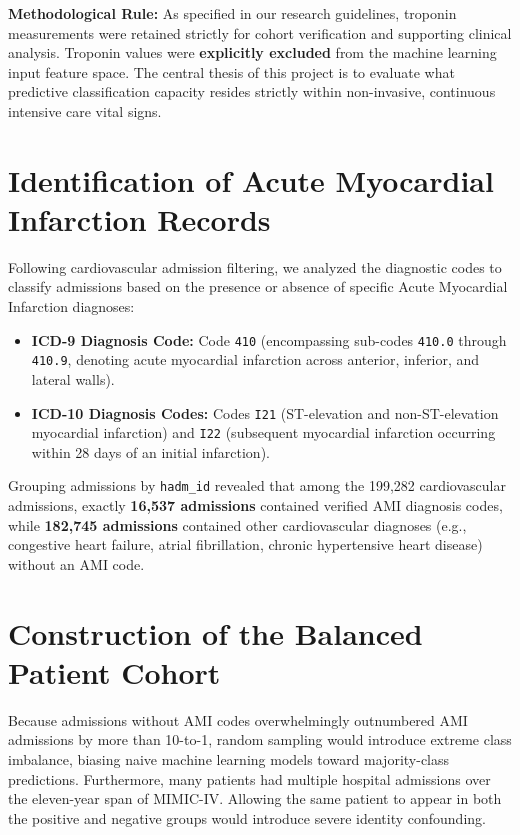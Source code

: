 \documentclass[12pt,a4paper,oneside]{report}
\begin{document}
\textbf{Methodological Rule:} As specified in our research guidelines, troponin measurements were retained strictly for cohort verification and supporting clinical analysis. Troponin values were \textbf{explicitly excluded} from the machine learning input feature space. The central thesis of this project is to evaluate what predictive classification capacity resides strictly within non-invasive, continuous intensive care vital signs.

\section{Identification of Acute Myocardial Infarction Records}
\label{sec:ami_identification}

Following cardiovascular admission filtering, we analyzed the diagnostic codes to classify admissions based on the presence or absence of specific Acute Myocardial Infarction diagnoses:
\begin{itemize}
    \item \textbf{ICD-9 Diagnosis Code:} Code \texttt{410} (encompassing sub-codes \texttt{410.0} through \texttt{410.9}, denoting acute myocardial infarction across anterior, inferior, and lateral walls).
    \item \textbf{ICD-10 Diagnosis Codes:} Codes \texttt{I21} (ST-elevation and non-ST-elevation myocardial infarction) and \texttt{I22} (subsequent myocardial infarction occurring within 28 days of an initial infarction).
\end{itemize}

Grouping admissions by \texttt{hadm\_id} revealed that among the 199,282 cardiovascular admissions, exactly \textbf{16,537 admissions} contained verified AMI diagnosis codes, while \textbf{182,745 admissions} contained other cardiovascular diagnoses (e.g., congestive heart failure, atrial fibrillation, chronic hypertensive heart disease) without an AMI code.

\section{Construction of the Balanced Patient Cohort}
\label{sec:cohort_construction}

Because admissions without AMI codes overwhelmingly outnumbered AMI admissions by more than 10-to-1, random sampling would introduce extreme class imbalance, biasing naive machine learning models toward majority-class predictions. Furthermore, many patients had multiple hospital admissions over the eleven-year span of MIMIC-IV. Allowing the same patient to appear in both the positive and negative groups would introduce severe identity confounding.
\end{document}
